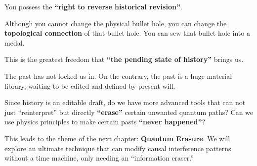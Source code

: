 You possess the \textbf{``right to reverse historical revision''}.

Although you cannot change the physical bullet hole, you can change the \textbf{topological connection} of that bullet hole. You can sew that bullet hole into a medal.

This is the greatest freedom that \textbf{``the pending state of history''} brings us.

The past has not locked us in. On the contrary, the past is a huge material library, waiting to be edited and defined by present will.

Since history is an editable draft, do we have more advanced tools that can not just ``reinterpret'' but directly \textbf{``erase''} certain unwanted quantum paths? Can we use physics principles to make certain pasts \textbf{``never happened''}?

This leads to the theme of the next chapter: \textbf{Quantum Erasure}. We will explore an ultimate technique that can modify causal interference patterns without a time machine, only needing an ``information eraser.''

